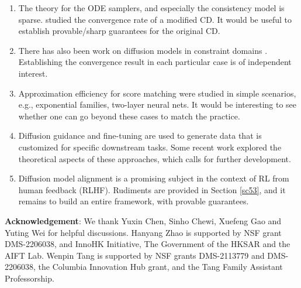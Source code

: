 \documentclass[letterpaper,11pt,reqno]{amsart}
\numberwithin{equation}{section}
\begin{document}
\begin{enumerate}[itemsep = 3 pt]
\item
The theory for 
the ODE samplers, and especially the consistency model is sparse.
\cite{LHW24} studied the convergence rate of a modified CD.
It would be useful to establish provable/sharp guarantees for
the original CD. 
\item
There has also been work on diffusion models in constraint domains
\cite{DS22, FK23, LE23, RDD22}.
Establishing the convergence result in each particular case is of independent interest.
\item
Approximation efficiency for score matching were studied
in simple scenarios,
e.g., exponential families, two-layer neural nets. 
It would be interesting to see whether 
one can go beyond these cases 
to match the practice.
\item 
Diffusion guidance \cite{Dh21, HS21} and fine-tuning \cite{UZ24, UZ242}
are used to generate data that is customized for specific downstream tasks.
Some recent work \cite{Guo24, Tang24, TX25, WC24}
explored the theoretical aspects of these approaches,
which calls for further development.
\item
Diffusion model alignment is a promising subject
in the context of RL from human feedback (RLHF).
Rudiments are provided in Section \ref{sc53},
and it remains to build an entire framework, 
with provable guarantees.
\end{enumerate}



\bigskip
{\bf Acknowledgement}: 
We thank Yuxin Chen, Sinho Chewi, Xuefeng Gao and Yuting Wei for helpful discussions.
Hanyang Zhao is supported by NSF grant DMS-2206038,
and InnoHK Initiative, The
Government of the HKSAR and the AIFT Lab.
Wenpin Tang is supported by NSF grants DMS-2113779 and
DMS-2206038, 
the Columbia Innovation Hub grant, 
and the Tang Family Assistant Professorship.






\end{document}
